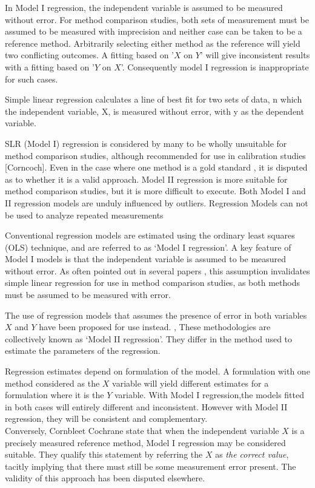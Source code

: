 \documentclass[12pt, a4paper]{report}
\theoremstyle{plain}
\theoremstyle{definition}
\theoremstyle{remark}
\begin{document}
In Model I regression, the independent variable is assumed to be
measured without error. For method comparison studies, both sets of measurement must be assumed to be measured with imprecision and neither case can be taken to be a reference method. Arbitrarily
selecting either method as the reference will yield two conflicting outcomes. A fitting based on '$X$ on $Y$' will give inconsistent results with a fitting based on '$Y$ on $X$'. Consequently model I regression is inappropriate for such cases.



 
Simple linear regression calculates a line of best fit for two
sets of data, n which the independent variable, X, is measured without error, with y as the dependent variable.  

SLR (Model I) regression is considered by many \citet{BA83,CornCoch,ludbrook97} to be wholly unsuitable for
method comparison studies, although recommended for use in calibration studies [Corncoch]. Even in the case where one
method is a gold standard , it is disputed as to whether it is a valid approach. Model II regression is more suitable for method comparison studies, but it is more difficult to execute. Both Model I and II regression models are unduly influenced by outliers. Regression Models can not be used to analyze repeated measurements


Conventional regression models are estimated using the ordinary least squares (OLS) technique, and are referred to as `Model I regression'\citep{CornCoch,ludbrook97}. A key feature of Model I models is that the independent variable is assumed to be measured without error. As often pointed out in several papers \citep{BA83,ludbrook97}, this assumption invalidates simple linear
regression for use in method comparison studies, as both methods must be assumed to be measured with error.

The use of regression models that assumes the presence of error in both variables $X$ and $Y$ have been proposed for use instead. \citep{CornCoch,ludbrook97}, These methodologies are collectively known as `Model II regression'. They differ in the method used to
estimate the parameters of the regression.

Regression estimates depend on formulation of the model. A formulation with one method considered as the $X$ variable will
yield different estimates for a formulation where it is the $Y$ variable. With Model I regression,the models fitted in both cases
will entirely different and inconsistent. However with Model II
regression, they will be consistent and complementary.
\\
Conversely, Cornbleet Cochrane state that when the independent
variable $X$ is a precisely measured reference method, Model I
regression may be considered suitable. They qualify this statement
by referring the $X$ as \emph{the correct value}, tacitly
implying that there must still be some measurement error present.
The validity of this approach has been disputed elsewhere.
\end{document}
